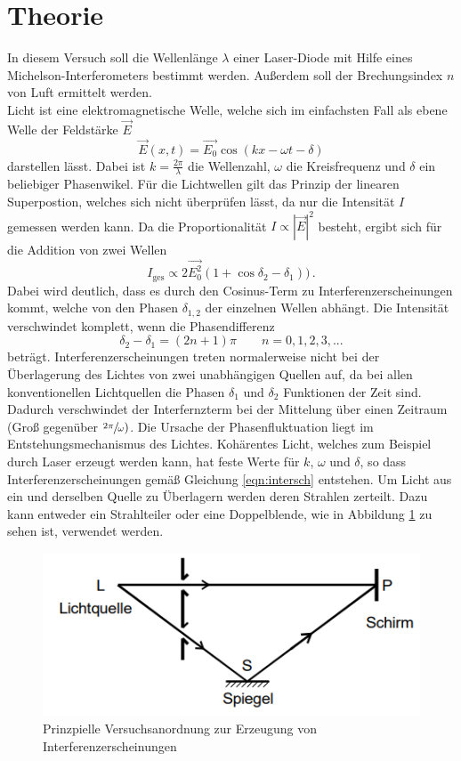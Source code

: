 \section{Theorie}
\label{sec:Theorie}
In diesem Versuch soll die Wellenlänge $\lambda$ einer Laser-Diode mit Hilfe eines Michelson-Interferometers bestimmt werden.
Außerdem soll der Brechungsindex $n$ von Luft ermittelt werden.\\
Licht ist eine elektromagnetische Welle, welche sich im einfachsten Fall als ebene Welle der Feldstärke $\vec{E}$
\begin{equation*}
    \vec{E}(x,t)=\vec{E_0} \cos (kx-\omega t - \delta)
\end{equation*}
darstellen lässt.
Dabei ist $k=\frac{2 \pi}{\lambda}$ die Wellenzahl, $\omega$ die Kreisfrequenz und $\delta$ ein beliebiger Phasenwikel.
Für die Lichtwellen gilt das Prinzip der linearen Superpostion, welches sich nicht überprüfen lässt, da nur die Intensität $I$ gemessen werden kann.
Da die Proportionalität $I \propto |\vec{E}|^2$ besteht, ergibt sich für die Addition von zwei Wellen
\begin{equation}
    I_\text{ges} \propto 2 \vec{E_0^2} (1+\cos \delta_2 -\delta_1)) \, .
    \label{eqn:intersch}
\end{equation}
Dabei wird deutlich, dass es durch den Cosinus-Term zu Interferenzerscheinungen kommt, welche von den Phasen $\delta_{1,2}$ der einzelnen Wellen abhängt.
Die Intensität verschwindet komplett, wenn die Phasendifferenz
\begin{equation*}
\delta_2 - \delta_1 = (2n+1)\pi \qquad n=0,1,2,3, ...
\end{equation*}
beträgt. 
Interferenzerscheinungen treten normalerweise nicht bei der Überlagerung des Lichtes von zwei unabhängigen Quellen auf, da bei allen konventionellen Lichtquellen die Phasen 
$\delta_1$ und $\delta_2$ Funktionen der Zeit sind. Dadurch verschwindet der Interfernzterm bei der Mittelung über einen Zeitraum (Groß gegenüber $\sfrac{2\pi}{\omega})$.
Die Ursache der Phasenfluktuation liegt im Entstehungsmechanismus des Lichtes.
Kohärentes Licht, welches zum Beispiel durch Laser erzeugt werden kann, hat feste Werte für $k$, $\omega$ und $\delta$, so dass Interferenzerscheinungen gemäß Gleichung \eqref{eqn:intersch} entstehen.
Um Licht aus ein und derselben Quelle zu Überlagern werden deren Strahlen zerteilt. Dazu kann entweder ein Strahlteiler oder eine Doppelblende, wie in Abbildung \ref{fig:dopl} zu sehen ist, verwendet werden.
\begin{figure}
    \centering
    \caption{Prinzpielle Versuchsanordnung zur Erzeugung von Interferenzerscheinungen \cite{v401}}
    \label{fig:dopl}
    \includegraphics[width = 0.5 \textwidth]{pics/Aufbau Doppelspalt.png}
\end{figure}
